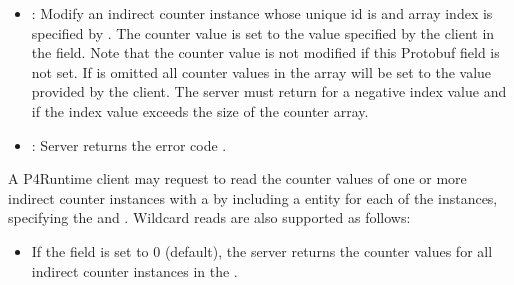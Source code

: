 \documentclass[11pt]{article}
\begin{document}
{\begin{itemize}[noitemsep,topsep=\mdcompacttopsep]
\item{}: Modify an indirect counter instance whose unique id is 
and array index is specified by . The counter value is set to the value
specified by the client in the  field. Note that the counter value is
not modified if this Protobuf field is not set. If  is omitted all
counter values in the array will be set to the value provided by the
client. The server must return  for a negative index value
and  if the index value exceeds the size of the counter array.%

\item{}: Server returns the error code .%
\end{itemize}%

\noindent{}A P4Runtime client may request to read the counter values of one or more
indirect counter instances with a  by including a 
entity for each of the instances, specifying the  and
. Wildcard reads are also supported as follows:%

\begin{itemize}%

\item{}
If the  field is set to 0 (default), the server returns the
counter values for all indirect counter instances in the .%


\end{itemize}}
\end{document}
